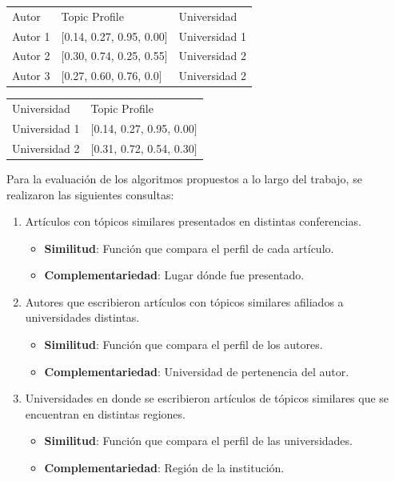 \begin{table}[H]
\begin{tabular}{lll}
	Autor & Topic Profile & Universidad \\
	Autor 1 & $[$0.14, 0.27, 0.95, 0.00$]$ & Universidad 1 \\
	Autor 2 & $[$0.30, 0.74, 0.25, 0.55$]$ & Universidad 2 \\
	Autor 3 & $[$0.27, 0.60, 0.76, 0.0$]$ & Universidad 2 \\
\end{tabular}
\label{tabla:topicProfileEj2}
\end{table}

\begin{table}[H]
\begin{tabular}{ll}
	Universidad & Topic Profile \\
	Universidad 1 & $[$0.14, 0.27, 0.95, 0.00$]$ \\
	Universidad 2 & $[$0.31, 0.72, 0.54, 0.30$]$ \\
\end{tabular}
\label{tabla:topicProfileEj3}
\end{table}

Para la evaluación de los algoritmos propuestos a lo largo del trabajo, se realizaron las siguientes consultas:
\begin{enumerate}
	\item
		Artículos con tópicos similares presentados en distintas conferencias. \label{busqueda:articulos}
		\begin{itemize}
			\item \textbf{Similitud}: Función que compara el perfil de cada artículo.
			\item \textbf{Complementariedad}: Lugar dónde fue presentado.
		\end{itemize}

	\item
	Autores que escribieron artículos con tópicos similares afiliados a universidades distintas. \label{busqueda:autores}
	\begin{itemize}
		\item \textbf{Similitud}: Función que compara el perfil de los autores.
		\item \textbf{Complementariedad}: Universidad de pertenencia del autor.
	\end{itemize}

	\item 
	Universidades en donde se escribieron artículos de tópicos similares que se encuentran en distintas regiones. \label{busqueda:universidades}
	\begin{itemize}
		\item \textbf{Similitud}: Función que compara el perfil de las universidades.
		\item \textbf{Complementariedad}: Región de la institución.
	\end{itemize}
\end {enumerate}

